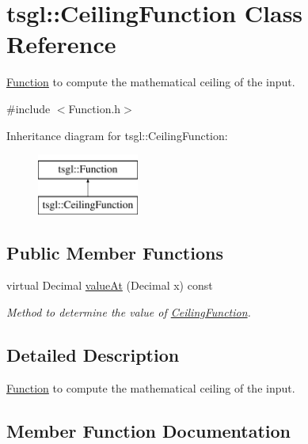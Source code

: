 \hypertarget{classtsgl_1_1_ceiling_function}{}\section{tsgl\+:\+:Ceiling\+Function Class Reference}
\label{classtsgl_1_1_ceiling_function}


\hyperlink{classtsgl_1_1_function}{Function} to compute the mathematical ceiling of the input.  




{\ttfamily \#include $<$Function.\+h$>$}

Inheritance diagram for tsgl\+:\+:Ceiling\+Function\+:\begin{figure}[H]
\begin{center}
\leavevmode
\includegraphics[height=2.000000cm]{classtsgl_1_1_ceiling_function}
\end{center}
\end{figure}
\subsection*{Public Member Functions}
\begin{DoxyCompactItemize}
\item 
virtual Decimal \hyperlink{classtsgl_1_1_ceiling_function_ab47498860b2395e331f203c4025bcb81}{value\+At} (Decimal x) const 
\begin{DoxyCompactList}\small\item\em Method to determine the value of \hyperlink{classtsgl_1_1_ceiling_function}{Ceiling\+Function}. \end{DoxyCompactList}\end{DoxyCompactItemize}


\subsection{Detailed Description}
\hyperlink{classtsgl_1_1_function}{Function} to compute the mathematical ceiling of the input. 

\subsection{Member Function Documentation}
\hypertarget{classtsgl_1_1_ceiling_function_ab47498860b2395e331f203c4025bcb81}{}
